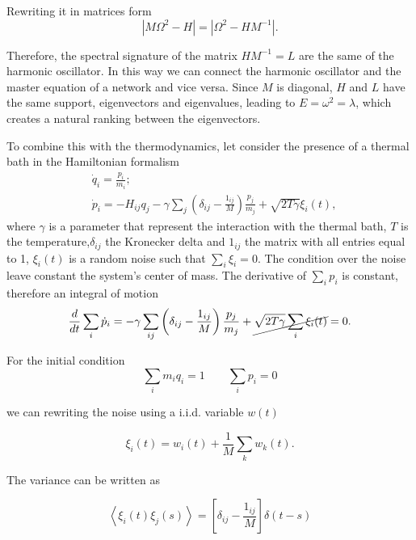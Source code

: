 Rewriting it in matrices form
\begin{equation}
    |M\Omega^2 - H| = |\Omega^2 - HM^{-1}|.
\end{equation}

Therefore, the spectral signature of the matrix $HM^{-1} = L$ are the same of the harmonic oscillator. In this way we can connect the harmonic oscillator and the master equation of a network and vice versa. Since $M$ is diagonal, $H$ and $L$ have the same support, eigenvectors and eigenvalues, leading to $E = \omega^2 = \lambda$, which creates a natural ranking between the eigenvectors. 

To combine this with the thermodynamics, let consider the presence of a thermal bath in the Hamiltonian formalism
\begin{equation}
    \begin{aligned}
        &\dot q_i = \frac{p_i}{m_i}; \\
        &\dot p_i  = -H_{ij}q_j - \gamma \sum_j \left(\delta_{ij} - \frac{1_{ij}}{M}\right)\frac{p_j}{m_j} + \sqrt{2T\gamma}\xi_i(t),
    \end{aligned}
\end{equation}
where $\gamma$ is a parameter that represent the interaction with the thermal bath, $T$ is the temperature,$\delta_{ij}$ the Kronecker delta and $1_{ij}$ the matrix with all entries equal to 1,  $\xi_i(t)$ is a random noise such that $\sum_i \xi_i = 0$. The condition over the noise leave constant the system's center of mass.
The derivative of $\sum_i p_i$ is constant, therefore an integral of motion
\begin{equation}
        \frac{d}{dt} \sum_i \dot p_i = - \gamma \sum_{ij}\left(\delta_{ij} - \frac{1_{ij}}{M}\right) \frac{p_j}{m_j} + \cancel{\sqrt{2T\gamma}\sum_i\xi_i(t)} = 0.
\end{equation}

For the initial condition
\begin{equation}
    \sum_i m_i q_i = 1 \qquad \sum_i p_i = 0
\end{equation}

we can rewriting the noise using a i.i.d. variable $w(t)$

\begin{equation}
    \xi_i(t) = w_i (t) + \frac{1}{M} \sum_k w_k(t).
\end{equation}

The variance can be written as

\begin{equation}
    \left<\xi_i(t)\xi_j(s)\right> = \left[\delta_{ij} - \frac{1_{ij}}{M}\right]\delta(t-s)
\end{equation}

